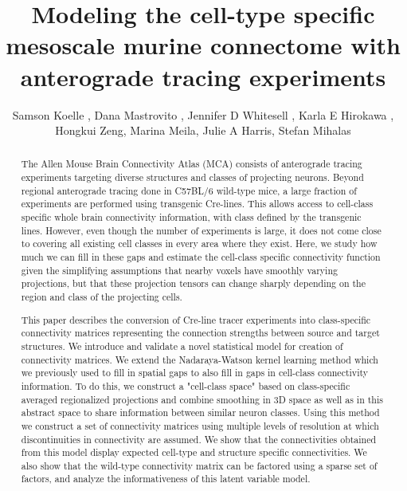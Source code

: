 \documentclass[NETN,manuscript]{stjour-new}
\begin{document}
\title{Modeling the cell-type specific mesoscale murine connectome with anterograde tracing experiments}

\author[Koelle et al]%
{Samson Koelle , Dana Mastrovito , Jennifer D Whitesell , Karla E Hirokawa ,  Hongkui Zeng, Marina Meila, Julie A Harris, Stefan Mihalas}





\begin{abstract}
The Allen Mouse Brain Connectivity Atlas (MCA) consists of anterograde tracing experiments targeting diverse structures and classes of projecting neurons.
Beyond regional anterograde tracing done in C57BL/6 wild-type mice, a large fraction of experiments are performed using transgenic Cre-lines.
This allows access to cell-class specific whole brain connectivity information, with class defined by the transgenic lines.
However, even though the number of experiments is large, it does not come close to covering all existing cell classes in every area where they exist.
Here, we study how much we can fill in these gaps and estimate the cell-class specific connectivity function given the simplifying assumptions that nearby voxels have smoothly varying projections, but that these projection tensors can change sharply depending on the region and class of the projecting cells.

This paper describes the conversion of Cre-line tracer experiments into class-specific connectivity matrices representing the connection strengths between source and target structures.
We introduce and validate a novel statistical model for creation of connectivity matrices.
We extend the Nadaraya-Watson kernel learning method which we previously used to fill in spatial gaps to also fill in gaps in cell-class connectivity information.
To do this, we construct a "cell-class space" based on class-specific averaged regionalized projections and combine smoothing in 3D space as well as in this abstract space to share information between similar neuron classes.
Using this method we construct a set of connectivity matrices using multiple levels of resolution at which discontinuities in connectivity are assumed. We show that the connectivities obtained from this model display expected cell-type and structure specific connectivities. 
We also show that the wild-type connectivity matrix can be factored using a sparse set of factors, and analyze the informativeness of this latent variable model.

\end{abstract}
\end{document}
